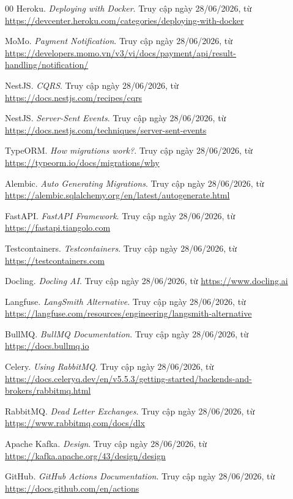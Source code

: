 \begin{thebibliography}{00}
Heroku. \textit{Deploying with Docker}. Truy cập ngày 28/06/2026, từ \url{https://devcenter.heroku.com/categories/deploying-with-docker}

MoMo. \textit{Payment Notification}. Truy cập ngày 28/06/2026, từ \url{https://developers.momo.vn/v3/vi/docs/payment/api/result-handling/notification/}

NestJS. \textit{CQRS}. Truy cập ngày 28/06/2026, từ \url{https://docs.nestjs.com/recipes/cqrs}

NestJS. \textit{Server-Sent Events}. Truy cập ngày 28/06/2026, từ \url{https://docs.nestjs.com/techniques/server-sent-events}

TypeORM. \textit{How migrations work?}. Truy cập ngày 28/06/2026, từ \url{https://typeorm.io/docs/migrations/why}

Alembic. \textit{Auto Generating Migrations}. Truy cập ngày 28/06/2026, từ \url{https://alembic.sqlalchemy.org/en/latest/autogenerate.html}

FastAPI. \textit{FastAPI Framework}. Truy cập ngày 28/06/2026, từ \url{https://fastapi.tiangolo.com}

Testcontainers. \textit{Testcontainers}. Truy cập ngày 28/06/2026, từ \url{https://testcontainers.com}

Docling. \textit{Docling AI}. Truy cập ngày 28/06/2026, từ \url{https://www.docling.ai}

Langfuse. \textit{LangSmith Alternative}. Truy cập ngày 28/06/2026, từ \url{https://langfuse.com/resources/engineering/langsmith-alternative}

BullMQ. \textit{BullMQ Documentation}. Truy cập ngày 28/06/2026, từ \url{https://docs.bullmq.io}

Celery. \textit{Using RabbitMQ}. Truy cập ngày 28/06/2026, từ \url{https://docs.celeryq.dev/en/v5.5.3/getting-started/backends-and-brokers/rabbitmq.html}

RabbitMQ. \textit{Dead Letter Exchanges}. Truy cập ngày 28/06/2026, từ \url{https://www.rabbitmq.com/docs/dlx}

Apache Kafka. \textit{Design}. Truy cập ngày 28/06/2026, từ \url{https://kafka.apache.org/43/design/design}

GitHub. \textit{GitHub Actions Documentation}. Truy cập ngày 28/06/2026, từ \url{https://docs.github.com/en/actions}


\end{thebibliography}
